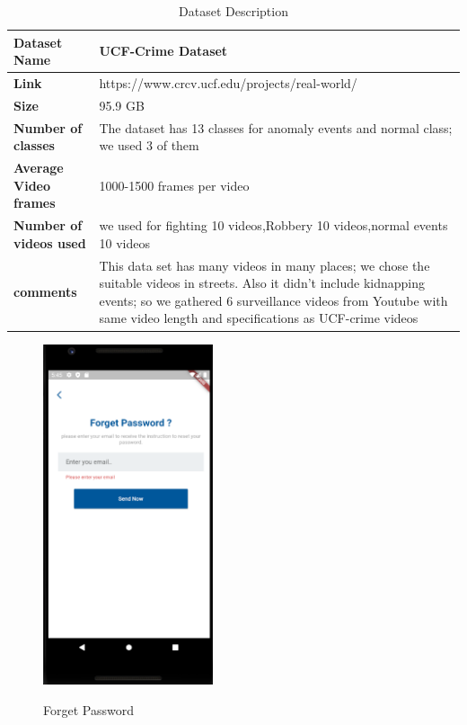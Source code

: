 \documentclass[12pt]{article}
\begin{document}
\FloatBarrier
\begin{table}[htbp]
\centering
\label{tab:ds}
\caption{Dataset Description}
\begin{tabular}{ | l | m{11cm}|} 
\hline
\textbf{Dataset Name} & UCF-Crime Dataset   \\ 
\hline
\textbf{Link} &  https://www.crcv.ucf.edu/projects/real-world/ \\ 
\hline
\textbf{Size} & 95.9 GB  \\ 
\hline
\textbf{Number of classes} & The dataset has 13 classes for anomaly events and normal class; we used 3 of them  \\
\hline
\textbf{Average Video frames} & 1000-1500 frames per video \\
\hline
\textbf{Number of videos used} & we used for fighting 10 videos,Robbery 10 videos,normal events 10 videos \\
\hline
\textbf{comments} & This data set has many videos in many places; we chose the suitable videos in streets. Also it didn't include kidnapping events; so we gathered 6 surveillance videos from Youtube with same video length and specifications as UCF-crime videos \\
\hline
\end{tabular}
\end{table}
 \FloatBarrier
\begin{figure}[h]
  \centering
  \includegraphics[width=5cm]{ForgetPass.PNG}
  \label{fig:2}
   \caption{Forget Password}
\end{figure}
\FloatBarrier
\end{document}
